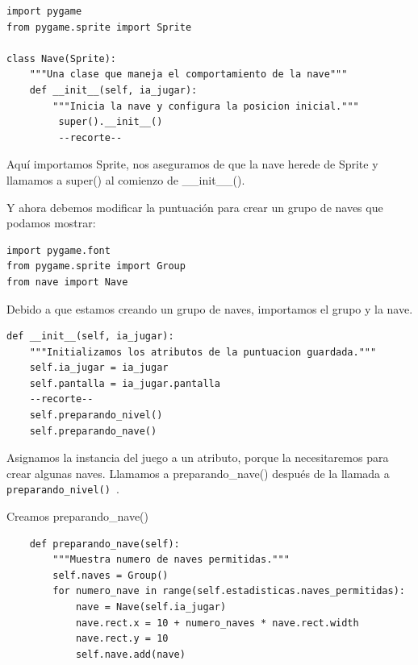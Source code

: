 \hspace{-2.5cm}{\ttfamily \scriptsize nave.py}  \vspace{-0.5cm}
\begin{lstlisting}		
import pygame 
from pygame.sprite import Sprite

class Nave(Sprite):
    """Una clase que maneja el comportamiento de la nave"""
    def __init__(self, ia_jugar):
        """Inicia la nave y configura la posicion inicial."""
         super().__init__()
         --recorte--
\end{lstlisting}

Aquí importamos  {\ttfamily  Sprite}, nos aseguramos de que la nave herede de {\ttfamily Sprite} y llamamos a {\ttfamily super()} al comienzo de {\ttfamily \_\_init\_\_()}.


Y ahora debemos modificar la puntuación para crear un grupo de naves que podamos mostrar:

\hspace{-2.9cm}{\ttfamily \scriptsize puntuacion.py}  \vspace{-0.5cm}
\begin{lstlisting}		
import pygame.font
from pygame.sprite import Group
from nave import Nave	
\end{lstlisting}


Debido a que estamos creando un grupo de naves, importamos el grupo y la nave.

\hspace{-2.9cm}{\ttfamily \scriptsize puntuacion.py}  \vspace{-0.5cm}
\begin{lstlisting}		
def __init__(self, ia_jugar):
    """Initializamos los atributos de la puntuacion guardada."""
    self.ia_jugar = ia_jugar
    self.pantalla = ia_jugar.pantalla
    --recorte--
    self.preparando_nivel()
    self.preparando_nave()	
\end{lstlisting}

Asignamos la instancia del juego a un atributo, porque la necesitaremos para
crear algunas naves. Llamamos a {\ttfamily preparando\_nave()} después de la llamada a {\tt preparando\_nivel() }.

Creamos    {\ttfamily preparando\_nave()} 

  
\hspace{-2.9cm}{\ttfamily \scriptsize puntuacion.py}  \vspace{-0.5cm}
\begin{lstlisting}		
    def preparando_nave(self):
        """Muestra numero de naves permitidas."""
        self.naves = Group()
        for numero_nave in range(self.estadisticas.naves_permitidas):
            nave = Nave(self.ia_jugar)
            nave.rect.x = 10 + numero_naves * nave.rect.width
            nave.rect.y = 10
            self.nave.add(nave)	
\end{lstlisting}

